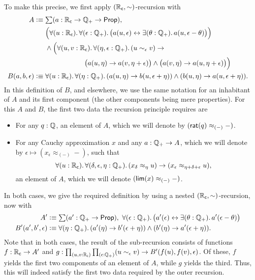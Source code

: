 To make this precise, we first apply $(\mathbb{R}_\mathsf{c},\sim)$-recursion with
\begin{align*}
  A \defeq\;& \sm{a:\RC\to\Qp\to\prop} \\
  &\Big(\fall{u:\RC}{\epsilon:\Qp}
  \big(a(u,\epsilon) \leftrightarrow \exis{\theta:\Qp} a(u,\epsilon-\theta)\big)\Big)  \\
  &\land \Big(\fall{u,v:\RC}{\eta,\epsilon:\Qp} (u\sim_\epsilon v) \to\\
  &\hspace{2cm}\big(a(u,\eta) \to a(v,\eta+\epsilon) \big) \land \big(a(v,\eta) \to a(u,\eta+\epsilon) \big)\Big)\\
  B(a,b,\epsilon) \defeq\;& \fall{u:\RC}{\eta:\Qp} (a(u,\eta) \to b(u,\epsilon+\eta)) \land (b(u,\eta) \to a(u,\epsilon+\eta)).
\end{align*}
In this definition of $B$, and elsewhere, we use the same notation for an inhabitant of $A$ and its first component (the other components being mere properties).
For this $A$ and $B$, the first two data the recursion principle requires are
\begin{itemize}
\item For any $q:\mathbb{Q}$, an element of $A$, which we will denote by $(\mathsf{rat}(q)\approx_{(-)} -)$.
\item For any Cauchy approximation $x$ and any $a:\mathbb{Q}_{+} \to A$, which we will denote by $\epsilon \mapsto (x_\epsilon \approx_{(-)} -)$, such that
  \begin{equation}
    \fall{u:\RC}{\delta,\epsilon,\eta:\Qp} (x_\delta \approx_\eta u) \to (x_\epsilon \approx_{\eta+\delta+\epsilon} u),\label{eq:appxrec2}
  \end{equation}
  an element of $A$, which we will denote $(\mathsf{lim}(x)\approx_{(-)} -)$.
\end{itemize}
In both cases, we give the required definition by using a nested $(\mathbb{R}_\mathsf{c},\sim)$-recursion, now with
\begin{align*}
  A' &\defeq \sm{a':\Qp\to\prop} \fall{\epsilon:\Qp}
  \big(a'(\epsilon) \leftrightarrow \exis{\theta:\Qp} a'(\epsilon-\theta)\big)\\
  B'(a',b',\epsilon) &\defeq \fall{\eta:\Qp} (a'(\eta) \to b'(\epsilon+\eta)) \land (b'(\eta) \to a'(\epsilon+\eta)).
\end{align*}
Note that in both cases, the result of the sub-recursion consists of functions $f:\mathbb{R}_\mathsf{c}\to A'$ and $g:\prd{u,v:\RC}{\epsilon:\Qp} (u\sim_\epsilon v) \to B'(f(u),f(v),\epsilon)$.
Of these, $f$ yields the first two components of an element of $A$, while $g$ yields the third.
Thus, this will indeed satisfy the first two data required by the outer recursion.


